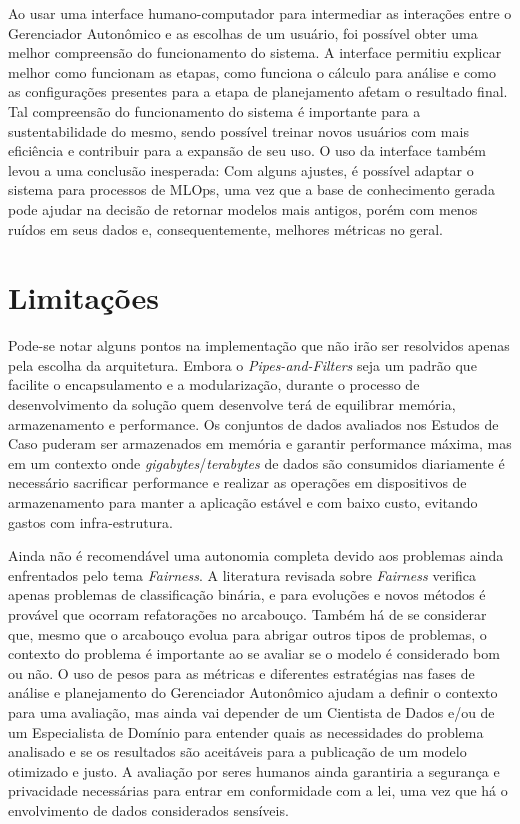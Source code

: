 \documentclass[Portugues,Final]{ic-tese-v3}
\begin{document}
Ao usar uma interface humano-computador para intermediar as interações entre o Gerenciador Autonômico e as escolhas de um usuário, foi possível obter uma melhor compreensão do funcionamento do sistema. A interface permitiu explicar melhor como funcionam as etapas, como funciona o cálculo para análise e como as configurações presentes para a etapa de planejamento afetam o resultado final. Tal compreensão do funcionamento do sistema é importante para a sustentabilidade do mesmo, sendo possível treinar novos usuários com mais eficiência e contribuir para a expansão de seu uso. O uso da interface também levou a uma conclusão inesperada: Com alguns ajustes, é possível adaptar o sistema para processos de MLOps, uma vez que a base de conhecimento gerada pode ajudar na decisão de retornar modelos mais antigos, porém com menos ruídos em seus dados e, consequentemente, melhores métricas no geral. 

\section{Limitações}

Pode-se notar alguns pontos na implementação que não irão ser resolvidos apenas pela escolha da arquitetura. Embora o \textit{Pipes-and-Filters} seja um padrão que facilite o encapsulamento e a modularização, durante o processo de desenvolvimento da solução quem desenvolve terá de equilibrar memória, armazenamento e performance. Os conjuntos de dados avaliados nos Estudos de Caso puderam ser armazenados em memória e garantir performance máxima, mas em um contexto onde \textit{gigabytes}/\textit{terabytes} de dados são consumidos diariamente é necessário sacrificar performance e realizar as operações em dispositivos de armazenamento para manter a aplicação estável e com baixo custo, evitando gastos com infra-estrutura.

Ainda não é recomendável uma autonomia completa devido aos problemas ainda enfrentados pelo tema \textit{Fairness}. A literatura revisada sobre \textit{Fairness} verifica apenas problemas de classificação binária, e para evoluções e novos métodos é provável que ocorram refatorações no arcabouço. Também há de se considerar que, mesmo que o arcabouço evolua para abrigar outros tipos de problemas, o contexto do problema é importante ao se avaliar se o modelo é considerado bom ou não. O uso de pesos para as métricas e diferentes estratégias nas fases de análise e planejamento do Gerenciador Autonômico ajudam a definir o contexto para uma avaliação, mas ainda vai depender de um Cientista de Dados e/ou de um Especialista de Domínio para entender quais as necessidades do problema analisado e se os resultados são aceitáveis para a publicação de um modelo otimizado e justo. A avaliação por seres humanos ainda garantiria a segurança e privacidade necessárias para entrar em conformidade com a lei, uma vez que há o envolvimento de dados considerados sensíveis.
\end{document}

